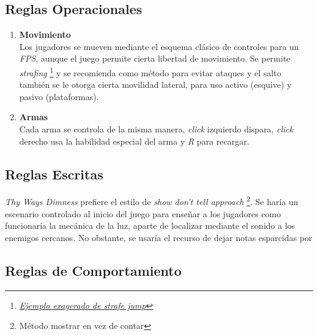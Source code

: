     \subsection{Reglas Operacionales}
        \begin{enumerate}[label=\alph*)]
            \item \textbf{\SpaceGrotesk Movimiento} \\
                Los jugadores se mueven mediante el esquema clásico de controles para un \textit{FPS}, aunque el juego permite cierta libertad de movimiento. Se permite \textit{strafing} \footnote{\href{https://www.youtube.com/watch?v=pUIqVz6qZLc}{\textit{Ejemplo exagerado de strafe jump}}} y se recomienda como método para evitar ataques y el salto también se le otorga cierta movilidad lateral, para uso activo (esquive) y pasivo (plataformas).
            \item \textbf{\SpaceGrotesk Armas} \\
                Cada arma se controla de la misma manera, \textit{click} izquierdo dispara, \textit{click} derecho usa la habilidad especial del arma y \textit{R} para recargar.
        \end{enumerate}
    \subsection{Reglas Escritas}
        \textit{Thy Ways Dimness} prefiere el estilo de \textit{show don't tell approach} \footnote{Método mostrar en vez de contar}. Se haría un escenario controlado al inicio del juego para enseñar a los jugadores como funcionaría la mecánica de la luz, aparte de localizar mediante el sonido a los enemigos cercanos.
        No obstante, se usaría el recurso de dejar notas esparcidas por
    \subsection{Reglas de Comportamiento}

